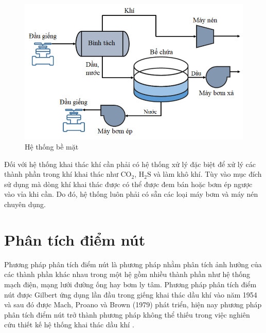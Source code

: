 \documentclass[12pt,a4paper]{report}
\begin{document}
	\begin{figure}[h]
		\centering
		\includegraphics[scale=0.75]{Fig/surface_facilities_system.png}
		\caption{Hệ thống bề mặt}
		\label{fig:surface_facilities_system}
	\end{figure}
\newpage
Đối với hệ thống khai thác khí cần phải có hệ thống xử lý đặc biệt để xử lý các thành phần trong khí khai thác như $\text{CO}_2$, $\text{H}_2\text{S}$ và làm khô khí. Tùy vào mục đích sử dụng mà dòng khí khai thác được có thể được đem bán hoặc bơm ép ngược vào vỉa khi cần. Do đó, hệ thống luôn phải có sẵn các loại máy bơm và máy nén chuyên dụng.

\section{Phân tích điểm nút}

Phương pháp phân tích điểm nút là phương pháp nhằm phân tích ảnh hưởng của các thành phần khác nhau trong một hệ gồm nhiều thành phần như hệ thống mạch điện, mạng lưới đường ống hay bơm ly tâm. Phương pháp phân tích điểm nút được Gilbert ứng dụng lần đầu trong giếng khai thác dầu khí vào năm 1954 và sau đó được Mach, Proano và Brown (1979) phát triển, hiện nay phương pháp phân tích điểm nút trở thành phương pháp không thể thiếu trong việc nghiên cứu thiết kế hệ thống khai thác dầu khí \cite{dale1991production}.
\end{document}
